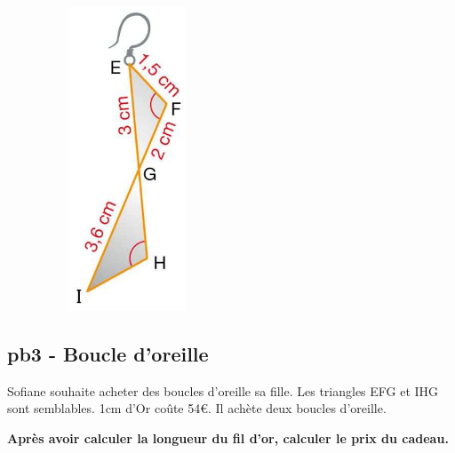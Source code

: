 \horrule{1px}

\begin{minipage}[t]{0.2\textwidth}
  \begin{figure}[H]
          \includegraphics[width=0.6\linewidth]{4x3-triangles-semblables/ie-pb3.png}
  \end{figure}
\end{minipage}
\begin{minipage}[t]{0.75\textwidth}
  \subsection*{pb3 - Boucle d'oreille}

  Sofiane souhaite acheter des boucles d'oreille sa fille. Les triangles EFG et IHG sont semblables. 1cm d'Or coûte 54€. Il achète deux boucles d'oreille.  

\textbf{Après avoir calculer la longueur du fil d'or, calculer le prix du cadeau. }
\end{minipage}

